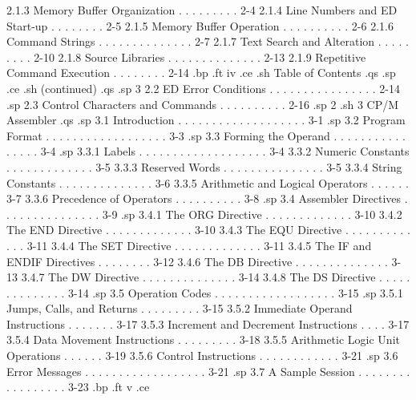         2.1.3  Memory Buffer Organization . . . . . . . . .   2-4
        2.1.4  Line Numbers and ED Start-up . . . . . . . .   2-5
        2.1.5  Memory Buffer Operation  . . . . . . . . . .   2-6
        2.1.6  Command Strings  . . . . . . . . . . . . . .   2-7
        2.1.7  Text Search and Alteration . . . . . . . . .  2-10
        2.1.8  Source Libraries . . . . . . . . . . . . . .  2-13
        2.1.9  Repetitive Command Execution . . . . . . . .  2-14
.bp
.ft                                iv
.ce
.sh
Table of Contents
.qs
.sp
.ce
.sh
(continued)
.qs
.sp 3
   2.2  ED Error Conditions . . . . . . . . . . . . . . . .  2-14
.sp
   2.3  Control Characters and Commands . . . . . . . . . .  2-16
.sp 2
.sh
3  CP/M Assembler
.qs
.sp
   3.1  Introduction  . . . . . . . . . . . . . . . . . . .   3-1
.sp
   3.2  Program Format  . . . . . . . . . . . . . . . . . .   3-3
.sp
   3.3  Forming the Operand . . . . . . . . . . . . . . . .   3-4
.sp
        3.3.1  Labels . . . . . . . . . . . . . . . . . . .   3-4
        3.3.2  Numeric Constants  . . . . . . . . . . . . .   3-5
        3.3.3  Reserved Words . . . . . . . . . . . . . . .   3-5
        3.3.4  String Constants . . . . . . . . . . . . . .   3-6
        3.3.5  Arithmetic and Logical Operators . . . . . .   3-7
        3.3.6  Precedence of Operators  . . . . . . . . . .   3-8
.sp
   3.4  Assembler Directives  . . . . . . . . . . . . . . .   3-9
.sp
        3.4.1  The ORG Directive  . . . . . . . . . . . . .  3-10
        3.4.2  The END Directive  . . . . . . . . . . . . .  3-10
        3.4.3  The EQU Directive  . . . . . . . . . . . . .  3-11
        3.4.4  The SET Directive  . . . . . . . . . . . . .  3-11
        3.4.5  The IF and ENDIF Directives  . . . . . . . .  3-12
        3.4.6  The DB Directive . . . . . . . . . . . . . .  3-13
        3.4.7  The DW Directive . . . . . . . . . . . . . .  3-14
        3.4.8  The DS Directive . . . . . . . . . . . . . .  3-14
.sp
   3.5  Operation Codes . . . . . . . . . . . . . . . . . .  3-15
.sp
        3.5.1  Jumps, Calls, and Returns  . . . . . . . . .  3-15
        3.5.2  Immediate Operand Instructions . . . . . . .  3-17
        3.5.3  Increment and Decrement Instructions . . . .  3-17
        3.5.4  Data Movement Instructions . . . . . . . . .  3-18
        3.5.5  Arithmetic Logic Unit Operations . . . . . .  3-19
        3.5.6  Control Instructions . . . . . . . . . . . .  3-21
.sp
   3.6  Error Messages  . . . . . . . . . . . . . . . . . .  3-21
.sp
   3.7  A Sample Session  . . . . . . . . . . . . . . . . .  3-23
.bp
.ft                                v
.ce
